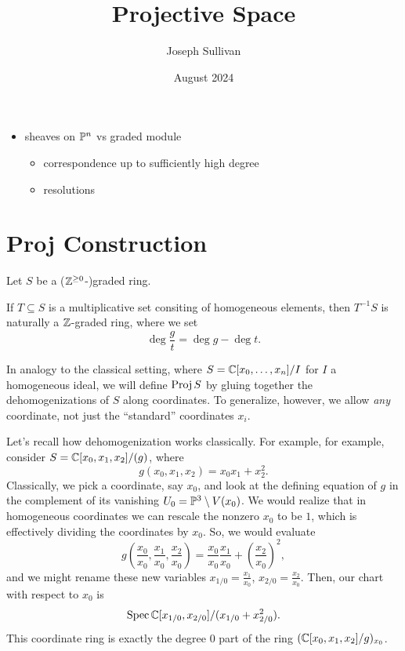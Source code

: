 \documentclass[12pt]{article}
\title{Projective Space}
\author{Joseph Sullivan}
\date{August 2024}
\begin{document}
\maketitle

\tableofcontents

\begin{itemize}
    \item sheaves on $\P^n$ vs graded module
    \begin{itemize}
        \item correspondence up to sufficiently high degree
        \item resolutions
    \end{itemize}
\end{itemize}

\section{Proj Construction}

Let $S$ be a ($\Z^{\geq 0}$-)graded ring.

\begin{rmk}
    If $T\subseteq S$ is a multiplicative set consiting of homogeneous elements, then $T^{-1}S$ is naturally a $\Z$-graded ring, where we set
    \[\deg \frac{g}{t} = \deg g - \deg t.\]
\end{rmk}

In analogy to the classical setting, where $S=\C[x_0,\dots,x_n]/I$ for $I$ a homogeneous ideal, we will define $\Proj S$ by gluing together the dehomogenizations of $S$ along coordinates. To generalize, however, we allow \textit{any} coordinate, not just the ``standard'' coordinates $x_i$.

Let's recall how dehomogenization works classically. For example, for example, consider $S=\C[x_0,x_1,x_2]/(g)$, where
\[g(x_0,x_1,x_2)=x_0 x_1 + x_2^2.\]
Classically, we pick a coordinate, say $x_0$, and look at the defining equation of $g$ in the complement of its vanishing $U_0 = \P^3\setminus V(x_0)$. We would realize that in homogeneous coordinates we can rescale the nonzero $x_0$ to be $1$, which is effectively dividing the coordinates by $x_0$. So, we would evaluate
\[g(\frac{x_0}{x_0}, \frac{x_1}{x_0}, \frac{x_2}{x_0}) = \frac{x_0}{x_0}\frac{x_1}{x_0} + \left(\frac{x_2}{x_0}\right)^2,\]
and we might rename these new variables $x_{1/0}=\frac{x_1}{x_0}$, $x_{2/0}=\frac{x_2}{x_0}$. Then, our chart with respect to $x_0$ is
\[\Spec \C[x_{1/0},x_{2/0}]/(x_{1/0}+x_{2/0}^2).\]
This coordinate ring is exactly the degree 0 part of the ring $(\C[x_0,x_1,x_2]/g)_{x_0}$.
\end{document}
